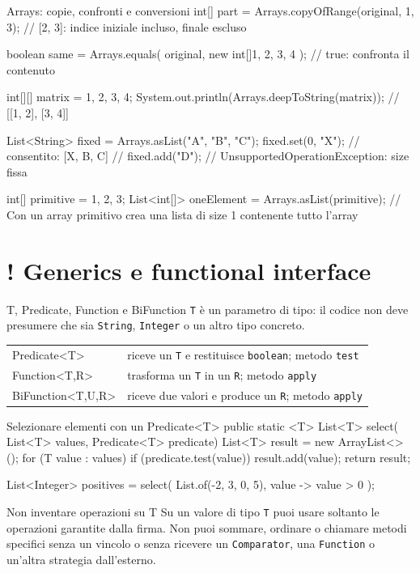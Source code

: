 ﻿\documentclass[10pt,a4paper]{article}
\newcommand{\cmd}[1]{\texttt{#1}}
\DeclareRobustCommand{\exammark}{%
  \texorpdfstring{\textcolor{examred}{\bfseries\Large !}\hspace{.18em}}{! }%
}
\newcommand{\topicsection}[1]{\Needspace{12\baselineskip}\section{#1}}
\newenvironment{topicblock}{%
  \par\medskip\noindent\begin{minipage}{\textwidth}%
}{%
  \end{minipage}\par\medskip%
}
\begin{document}
\begin{topicblock}
\begin{codebox}{Arrays: copie, confronti e conversioni}
int[] part = Arrays.copyOfRange(original, 1, 3);
// [2, 3]: indice iniziale incluso, finale escluso

boolean same = Arrays.equals(
    original, new int[]{1, 2, 3, 4}
); // true: confronta il contenuto

int[][] matrix = {{1, 2}, {3, 4}};
System.out.println(Arrays.deepToString(matrix)); // [[1, 2], [3, 4]]

List<String> fixed = Arrays.asList("A", "B", "C");
fixed.set(0, "X"); // consentito: [X, B, C]
// fixed.add("D"); // UnsupportedOperationException: size fissa

int[] primitive = {1, 2, 3};
List<int[]> oneElement = Arrays.asList(primitive);
// Con un array primitivo crea una lista di size 1 contenente tutto l'array
\end{codebox}

\end{topicblock}
\topicsection{\exammark Generics e functional interface}

\begin{concept}{T, Predicate, Function e BiFunction}
\cmd{T} è un parametro di tipo: il codice non deve presumere che sia
\cmd{String}, \cmd{Integer} o un altro tipo concreto.

\begin{tabularx}{\textwidth}{>{\ttfamily\small}p{4.2cm} X}
Predicate<T> & riceve un \cmd{T} e restituisce \cmd{boolean}; metodo \cmd{test} \\
Function<T,R> & trasforma un \cmd{T} in un \cmd{R}; metodo \cmd{apply} \\
BiFunction<T,U,R> & riceve due valori e produce un \cmd{R}; metodo \cmd{apply} \\
\end{tabularx}
\end{concept}

\begin{codebox}{Selezionare elementi con un Predicate<T>}
public static <T> List<T> select(
        List<T> values,
        Predicate<T> predicate) {
    List<T> result = new ArrayList<>();
    for (T value : values) {
        if (predicate.test(value)) {
            result.add(value);
        }
    }
    return result;
}

List<Integer> positives = select(
    List.of(-2, 3, 0, 5),
    value -> value > 0
);
\end{codebox}

\begin{examtrap}{Non inventare operazioni su T}
Su un valore di tipo \cmd{T} puoi usare soltanto le operazioni garantite
dalla firma. Non puoi sommare, ordinare o chiamare metodi specifici senza un
vincolo o senza ricevere un \cmd{Comparator}, una \cmd{Function} o un'altra
strategia dall'esterno.
\end{examtrap}
\end{document}

